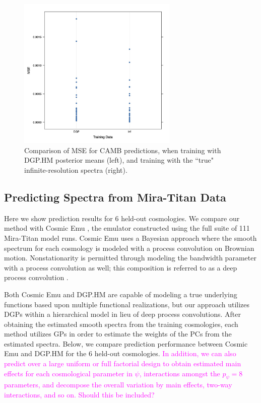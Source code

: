 \documentclass[11pt]{article}
\begin{document}
\begin{figure}
    \centering
    \includegraphics[width=3in]{mse_dot.jpg}
    \caption{Comparison of MSE for CAMB predictions, when training with DGP.HM posterior 
             means (left), and training with the ``true" infinite-resolution spectra (right).}   
    \label{fig:mse_camb}
\end{figure}

\subsection{Predicting Spectra from Mira-Titan Data}
\label{subsec:mira_pred}

Here we show prediction results for 6 held-out cosmologies. We compare our method 
with Cosmic Emu \citep{moran2023mira}, the emulator constructed using the full suite 
of 111 Mira-Titan model runs. Cosmic Emu uses a Bayesian approach where the smooth 
spectrum for each cosmology is modeled with a process convolution on Brownian motion. 
Nonstationarity is permitted through modeling the bandwidth parameter with a process 
convolution as well; this composition is referred to as a deep process convolution 
\citep{moran2024dpc}.

Both Cosmic Emu and DGP.HM are capable of modeling a true underlying functions based 
upon multiple functional realizations, but our approach utilizes DGPs within a 
hierarchical model in lieu of deep process convolutions. After obtaining the estimated 
smooth spectra from the training cosmologies, each method utilizes GPs in order to 
estimate the weights of the PCs from the estimated spectra. Below, we compare prediction 
performance between Cosmic Emu and DGP.HM for the 6 held-out cosmologies. 
\textcolor{magenta}{In addition, we can also predict over a large uniform or full 
factorial design to obtain estimated main effects for each cosmological parameter in 
$\psi$, interactions amongst the $p_\psi=8$ parameters, and decompose the overall 
variation by main effects, two-way interactions, and so on. Should this be included?}
\end{document}
